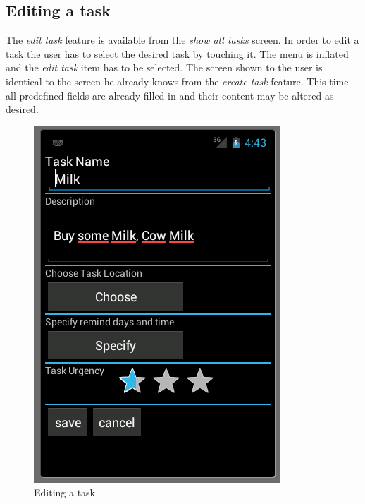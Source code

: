 \subsection{Editing a task}
The \emph{edit task} feature is available from the \emph{show all tasks} screen.
In order to edit a task the user has to select the desired task by touching it.
The menu is inflated and the \emph{edit task} item has to be selected.
\newline
\newline
The screen shown to the user is identical to the screen he already
knows from the \emph{create task} feature. This time all predefined fields are
already filled in and their content may be altered as desired.
 \begin{figure}[h]
  \caption{Editing a task}
  \center
  	\includegraphics[scale=0.25]{../resources/edit-task.png}
\end{figure}

